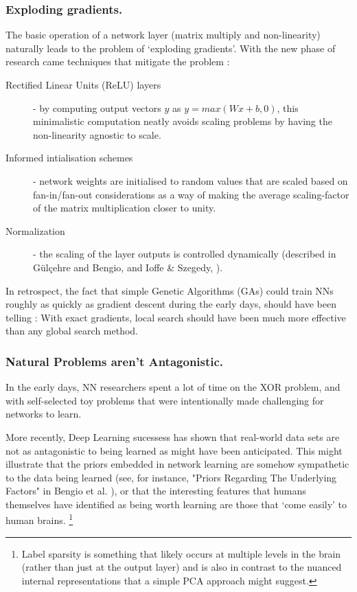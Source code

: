 \documentclass[citeauthoryear]{llncs}
\begin{document}
\subsubsection*{Exploding gradients.}

The basic operation of a network layer (matrix multiply and non-linearity) 
naturally leads to the problem of `exploding gradients'.
With the new phase of research came techniques that mitigate the problem : 

\begin{description}

\item[Rectified Linear Units (ReLU) layers] - by computing output vectors $y$ 
as $y=max(Wx+b, 0)$, this minimalistic computation neatly avoids 
scaling problems by having the non-linearity agnostic to scale.

\item[Informed intialisation schemes] - network weights are initialised 
to random values that are scaled based on fan-in/fan-out considerations as a way of making the 
average scaling-factor of the matrix multiplication closer to unity.

\item[Normalization] - the scaling of the layer outputs is controlled
dynamically (described in G{\"u}l{\c{c}}ehre and Bengio, \cite{bengio-whitening} and 
Ioffe \& Szegedy, \cite{WhiteningOfData}).

\end{description}

In retrospect, the fact that simple Genetic Algorithms (GAs) could train 
NNs roughly as quickly as gradient descent during the early days, 
should have been telling : With exact gradients, local search should have 
been much more effective than any global search method.


\subsubsection*{Natural Problems aren't Antagonistic.}

In the early days, NN researchers spent a lot of time on the 
XOR problem, and with self-selected toy problems that were 
intentionally made challenging for networks to learn.

More recently, Deep Learning sucessess has shown that real-world data sets 
are not as antagonistic to being learned as might have been anticipated.  
This might illustrate that the priors embedded in network learning are 
somehow sympathetic to the data being learned 
(see, for instance, "Priors Regarding The Underlying Factors" in Bengio et al. \cite{Bengio-et-al-2014-Book}),
or that the interesting features that humans themselves have identified as being 
worth learning are those that `come easily' to human brains.
\footnote{
Label sparsity is something that likely occurs at multiple levels in the brain 
(rather than just at the output layer) and is also in contrast to the 
nuanced internal representations that a simple PCA approach might suggest.
}
\end{document}
